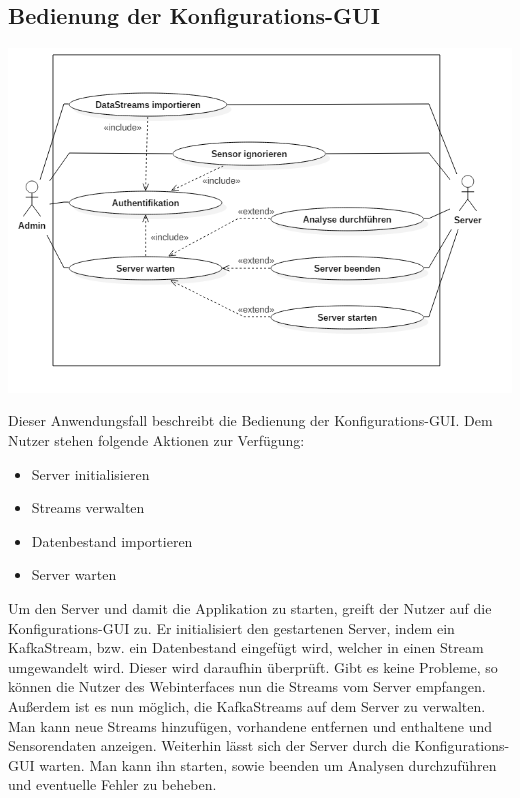     \subsection{Bedienung der Konfigurations-GUI}
        \includegraphics[width=1\linewidth]{diagrams/UseCaseDiagram2.png}
        
        Dieser Anwendungsfall beschreibt die Bedienung der Konfigurations-GUI. Dem Nutzer stehen folgende Aktionen zur Verfügung:
        \begin{itemize}
            \item Server initialisieren
            \item {}Streams verwalten
            \item Datenbestand importieren
            \item Server warten
        \end{itemize}
        Um den Server und damit die Applikation zu starten, greift der Nutzer auf die Konfigurations-GUI zu. Er initialisiert den gestartenen Server, indem ein KafkaStream, bzw. ein Datenbestand eingefügt wird, welcher in einen Stream umgewandelt wird. Dieser wird daraufhin überprüft. Gibt es keine Probleme, so können die Nutzer des Webinterfaces nun die Streams vom Server empfangen. Außerdem ist es nun möglich, die KafkaStreams auf dem Server zu verwalten. Man kann neue Streams hinzufügen, vorhandene entfernen und enthaltene  und Sensorendaten anzeigen. Weiterhin lässt sich der Server durch die Konfigurations-GUI warten. Man kann ihn starten, sowie beenden um Analysen durchzuführen und eventuelle Fehler zu beheben.
        

